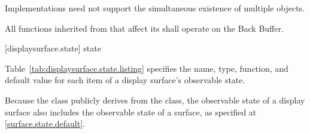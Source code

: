 \pnum
Implementations need not support the simultaneous existence of multiple  objects.

\pnum
All functions inherited from  that affect its \underlyingsurface shall operate on the Back Buffer.

 [displaysurface.state] { state}

\pnum
Table~\ref{tab:displaysurface.state.listing} specifies the name, type, function, and default value for each item of a display surface's observable state.

\pnum
Because the  class publicly derives from the  class, the observable state of a display surface also includes the observable state of a surface, as specified at \ref{surface.state.default}.

